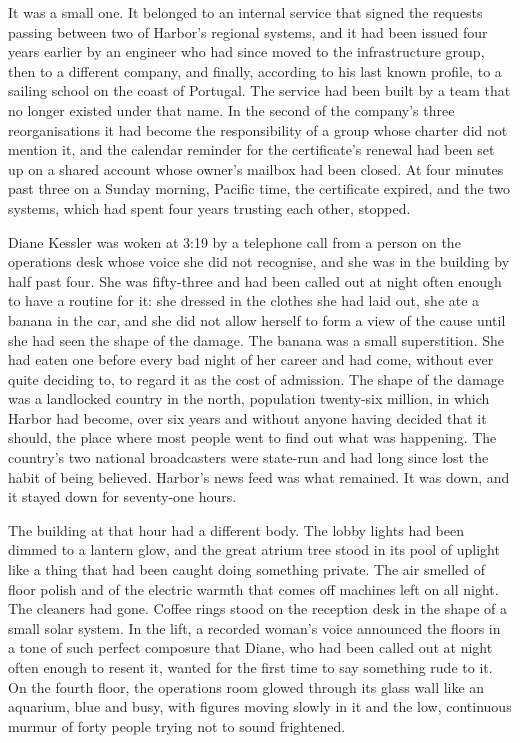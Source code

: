 It was a small one. It belonged to an internal service that signed the requests passing between two of Harbor's regional systems, and it had been issued four years earlier by an engineer who had since moved to the infrastructure group, then to a different company, and finally, according to his last known profile, to a sailing school on the coast of Portugal. The service had been built by a team that no longer existed under that name. In the second of the company's three reorganisations it had become the responsibility of a group whose charter did not mention it, and the calendar reminder for the certificate's renewal had been set up on a shared account whose owner's mailbox had been closed. At four minutes past three on a Sunday morning, Pacific time, the certificate expired, and the two systems, which had spent four years trusting each other, stopped.

Diane Kessler was woken at 3:19 by a telephone call from a person on the operations desk whose voice she did not recognise, and she was in the building by half past four. She was fifty-three and had been called out at night often enough to have a routine for it: she dressed in the clothes she had laid out, she ate a banana in the car, and she did not allow herself to form a view of the cause until she had seen the shape of the damage. The banana was a small superstition. She had eaten one before every bad night of her career and had come, without ever quite deciding to, to regard it as the cost of admission. The shape of the damage was a landlocked country in the north, population twenty-six million, in which Harbor had become, over six years and without anyone having decided that it should, the place where most people went to find out what was happening. The country's two national broadcasters were state-run and had long since lost the habit of being believed. Harbor's news feed was what remained. It was down, and it stayed down for seventy-one hours.

The building at that hour had a different body. The lobby lights had been dimmed to a lantern glow, and the great atrium tree stood in its pool of uplight like a thing that had been caught doing something private. The air smelled of floor polish and of the electric warmth that comes off machines left on all night. The cleaners had gone. Coffee rings stood on the reception desk in the shape of a small solar system. In the lift, a recorded woman's voice announced the floors in a tone of such perfect composure that Diane, who had been called out at night often enough to resent it, wanted for the first time to say something rude to it. On the fourth floor, the operations room glowed through its glass wall like an aquarium, blue and busy, with figures moving slowly in it and the low, continuous murmur of forty people trying not to sound frightened.

